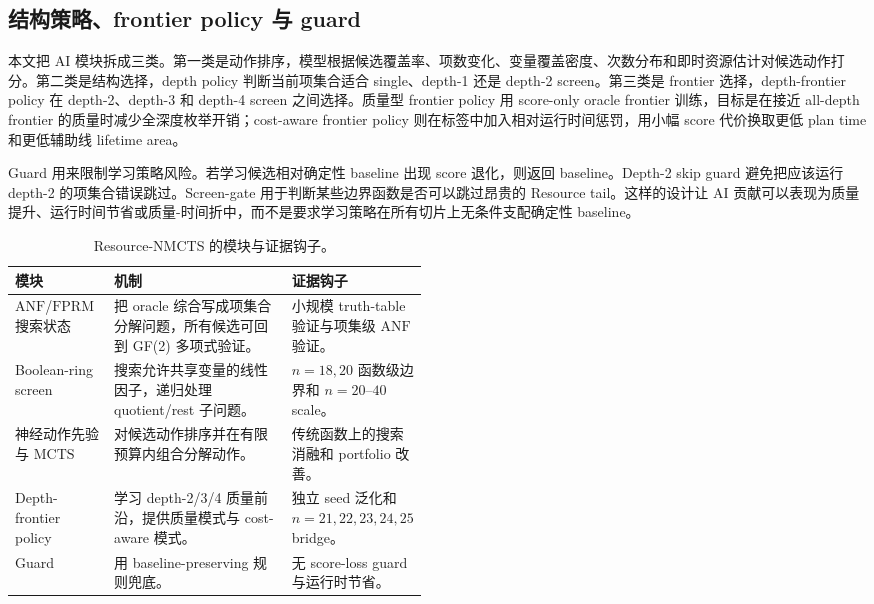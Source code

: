 \documentclass[UTF8,fontset=macnew,11pt]{ctexart}
\newcommand{\method}{Resource-NMCTS}
\newcommand{\anf}{\ensuremath{\mathrm{ANF}}}
\newcommand{\fprm}{\ensuremath{\mathrm{FPRM}}}
\newcommand{\mcts}{\ensuremath{\mathrm{MCTS}}}
\newcommand{\ttable}{truth-table}
\begin{document}
\subsection{结构策略、frontier policy 与 guard}

本文把 AI 模块拆成三类。第一类是动作排序，模型根据候选覆盖率、项数变化、变量覆盖密度、次数分布和即时资源估计对候选动作打分。第二类是结构选择，depth policy 判断当前项集合适合 single、depth-1 还是 depth-2 screen。第三类是 frontier 选择，depth-frontier policy 在 depth-2、depth-3 和 depth-4 screen 之间选择。质量型 frontier policy 用 score-only oracle frontier 训练，目标是在接近 all-depth frontier 的质量时减少全深度枚举开销；cost-aware frontier policy 则在标签中加入相对运行时间惩罚，用小幅 score 代价换取更低 plan time 和更低辅助线 lifetime area。

Guard 用来限制学习策略风险。若学习候选相对确定性 baseline 出现 score 退化，则返回 baseline。Depth-2 skip guard 避免把应该运行 depth-2 的项集合错误跳过。Screen-gate 用于判断某些边界函数是否可以跳过昂贵的 Resource tail。这样的设计让 AI 贡献可以表现为质量提升、运行时间节省或质量-时间折中，而不是要求学习策略在所有切片上无条件支配确定性 baseline。

\begin{table}[H]
\centering
\small
\caption{\method{} 的模块与证据钩子。}
\label{tab:modules}
\begin{tabularx}{\linewidth}{>{\raggedright\arraybackslash}p{0.24\linewidth}>{\raggedright\arraybackslash}X>{\raggedright\arraybackslash}p{0.24\linewidth}}
\toprule
模块 & 机制 & 证据钩子 \\
\midrule
\anf{}/\fprm{} 搜索状态 & 把 oracle 综合写成项集合分解问题，所有候选可回到 GF(2) 多项式验证。 & 小规模 \ttable{} 验证与项集级 \anf{} 验证。 \\
Boolean-ring screen & 搜索允许共享变量的线性因子，递归处理 quotient/rest 子问题。 & $n=18,20$ 函数级边界和 $n=20$--$40$ scale。 \\
神经动作先验与 \mcts{} & 对候选动作排序并在有限预算内组合分解动作。 & 传统函数上的搜索消融和 portfolio 改善。 \\
Depth-frontier policy & 学习 depth-2/3/4 质量前沿，提供质量模式与 cost-aware 模式。 & 独立 seed 泛化和 $n=21,22,23,24,25$ bridge。 \\
Guard & 用 baseline-preserving 规则兜底。 & 无 score-loss guard 与运行时节省。 \\
\bottomrule
\end{tabularx}
\end{table}
\end{document}
